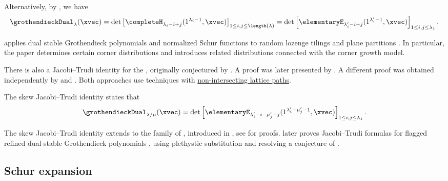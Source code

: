 Alternatively, by \cite{Yeliussizov2017,AmanovYeliussizov2020}, we have
\begin{align}
\grothendieckDual_\lambda(\xvec) =
\det\left[
\completeH_{\lambda_i-i+j}(1^{\lambda_i-1},\xvec)
\right]_{1\leq i,j \leq \length(\lambda)}
=
\det\left[
\elementaryE_{\lambda'_i-i+j}(1^{\lambda'_i-1},\xvec)
\right]_{1\leq i,j \leq \lambda_1}.
\end{align}

 applies dual stable Grothendieck polynomials and
normalized Schur functions to random lozenge tilings and plane partitions
\cite{Yeliussizov2021}.  In particular, the paper determines certain corner
distributions and introduces related distributions connected with the corner
growth model.

There is also a Jacobi--Trudi identity for the
\label{skewDualStableGrothendieckPolynomial},
originally conjectured by
.
A proof was later presented by 
\cite{Kim2021RefinedDualGrothendieckJT}.
A different proof was obtained independently by  and
 \cite{AmanovYeliussizov2020}.
Both approaches use techniques with
\hyperref[lgvLemma]{non-intersecting lattice paths}.



The skew Jacobi--Trudi identity states that
\begin{align}
\grothendieckDual_{\lambda/\mu}(\xvec) =
\det\left[
\elementaryE_{\lambda'_i-i-\mu'_j+j}(1^{\lambda'_i-\mu'_j-1},\xvec)
\right]_{1\leq i,j \leq \lambda_1}.
\end{align}


The skew Jacobi--Trudi identity extends to the family
of \label{refinedDualStableGrothendieckPolynomial},
introduced in \cite{GalashinGrinbergLiu2016}, see
\cite{Kim2021RefinedDualGrothendieckJT,AmanovYeliussizov2020} for proofs.
 later proves Jacobi--Trudi formulas for
flagged refined dual stable Grothendieck polynomials
\cite{Kim2022FlaggedRefinedDualGrothendieckJT}, using plethystic substitution
and resolving a conjecture of .


\subsection[dualGrothendieckSchurExpansion]{Schur expansion}

